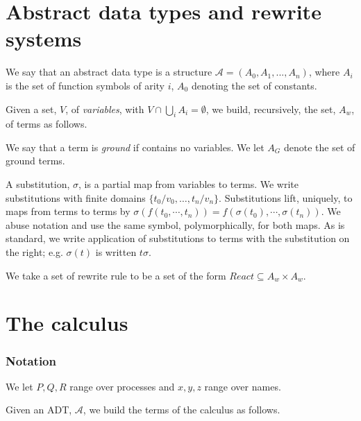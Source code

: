 \documentclass[]{entcs}
\begin{document}

\section{Abstract data types and rewrite systems}

We say that an abstract data type is a structure $\mathcal{A} =
(A_0,A_1,...,A_n)$, where $A_i$ is the set of function symbols of
arity $i$, $A_0$ denoting the set of constants.

Given a set, $V$, of \emph{variables}, with $ V \cap \bigcup_i A_i =
\emptyset$, we build, recursively, the set, $A_w$, of terms as
follows.



We say that a term is \emph{ground} if contains no variables. We let
$A_G$ denote the set of ground terms. 

A substitution, $\sigma$, is a partial map from variables to terms. We
write substitutions with finite domains $\{ t_0/v_0, \ldots, t_n/v_n
\}$. Substitutions lift, uniquely, to maps from terms to terms by 
$\sigma(f(t_0,\cdots,t_n)) = f(\sigma(t_0),\cdots,\sigma(t_n))$. We
abuse notation and use the same symbol, polymorphically, for both
maps. As is standard, we write application of substitutions to terms
with the substitution on the right; e.g. $\sigma(t)$ is written
$t\sigma$.

We take a set of rewrite rule to be a set of the form $React \subseteq
A_w \times A_w$.



\section{The calculus}

\subsubsection{Notation}

We let ${P, Q, R}$ range over processes and ${x, y, z}$ range over names.

Given an ADT, $\mathcal A$, we build the terms of the calculus as follows.
\end{document}
